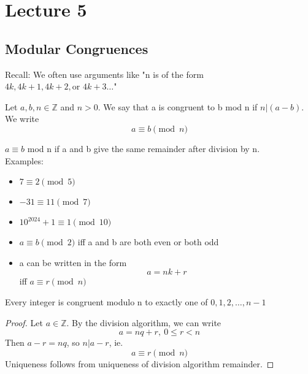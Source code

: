 \chapter{Lecture 5}
\date{September 10, 2024}

\section{Modular Congruences}
    Recall: We often use arguments like "n is of the form $4k,4k+1,4k+2,
    \text{or }4k+3\dots$"

    \begin{definition} [Precise]
        Let $a,b,n\in\mathbb{Z}$ and $n>0$. We say that a is congruent to 
        b mod n if $n|(a-b)$. We write
        \[
            a \equiv b \pmod{n}
        \]
    \end{definition}

    \begin{definition} [Informal]
        $a\equiv b$ mod n if a and b give the same remainder after division
        by n. \\
        Examples:
        \begin{itemize}
            \item $7\equiv 2 \pmod 5$
            \item $-31\equiv 11 \pmod 7$
            \item $10^{2024}+1\equiv 1 \pmod 10$
            \item $a\equiv b \pmod 2$ iff a and b are both even or both odd
            \item a can be written in the form 
            \[ a=nk+r \]
                iff $a\equiv r \pmod n$
        \end{itemize}
    \end{definition}

    \begin{proposition}
        Every integer is congruent modulo n to exactly one of $0,1,2,\dots,n-1$
        \begin{proof}
            Let $a\in\mathbb{Z}$. By the division algorithm, we can write
            \[ a=nq+r,\ 0\leq r<n \]
            Then $a-r=nq$, so $n|a-r$, ie.
            \[ a\equiv r \pmod{n} \]
            Uniqueness follows from uniqueness of division algorithm remainder.
        \end{proof}
    \end{proposition}

